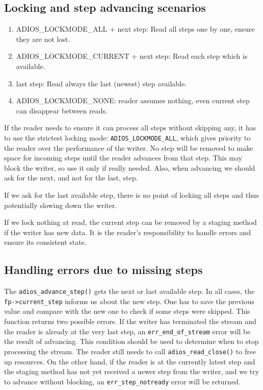 \subsection{Locking and step advancing scenarios}
  \begin{enumerate}  
  \item ADIOS\_LOCKMODE\_ALL + next step: Read all steps one by one, ensure they are not lost. 
  \item ADIOS\_LOCKMODE\_CURRENT + next step: Read each step which is available. 
  \item last step: Read always the last (newest) step available.
  \item ADIOS\_LOCKMODE\_NONE: reader assumes nothing, even current step can disappear between reads.
  \end{enumerate}

If the reader needs to ensure it can process all steps without skipping any, it has to use the strictest locking mode: \verb+ADIOS_LOCKMODE_ALL+, which gives priority to the reader over the performance of the writer. No step will be removed to make space for incoming steps until the reader advances from that step. This may block the writer, so use it only if really needed. Also, when advancing we should ask for the next, and not for the last, step. 

If we ask for the last available step, there is no point of locking all steps and thus potentially slowing down the writer. 

If we lock nothing at read, the current step can be removed by a staging method if the writer has new data. It is the reader's responsibility to handle errors and ensure its consistent state. 

\subsection{Handling errors due to missing steps}
The \verb+adios_advance_step()+ gets the next or last available step. In all cases, the \verb+fp->current_step+ informs us about the new step. One has to save the previous value and compare with the new one to check if some steps were skipped. This function returns two possible errors. If the writer has terminated the stream and the reader is already at the very last step, an \verb+err_end_of_stream+ error will be the result of advancing. This condition should be used to determine when to stop processing the stream. The reader still needs to call \verb+adios_read_close()+ to free up resources. On the other hand, if the reader is at the currently latest step and the staging method has not yet received a newer step from the writer, and we try to advance without blocking, an \verb+err_step_notready+ error will be returned.  



